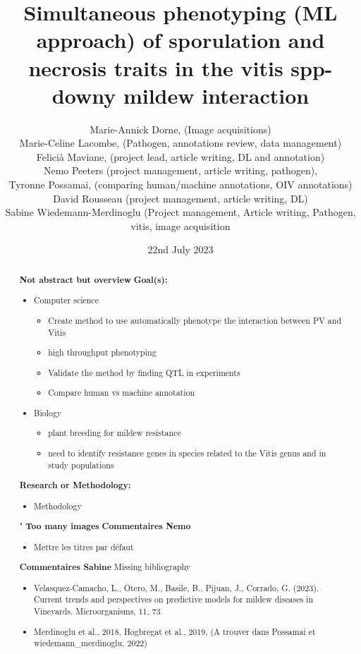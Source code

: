 \documentclass[english]{article}
\title{Simultaneous phenotyping (ML approach) of sporulation and necrosis traits in the vitis spp-downy mildew interaction}
\date{22nd July 2023}
\author{
Marie-Annick Dorne, (Image acquisitions)\\
Marie-Celine Lacombe, (Pathogen, annotations review, data management)\\
Felicià Maviane, (project lead, article writing, DL and annotation)\\
Nemo Peeters (project management, article writing, pathogen),\\
Tyronne Possamai, (comparing human/machine annotations, OIV annotations)\\
David Rousseau (project management, article writing, DL)\\
Sabine Wiedemann-Merdinoglu (Project management, Article writing, Pathogen, vitis, image acquisition\\
}
\begin{document}
\maketitle

\begin{changemargin}{60pt}{60pt}
	\begin{abstract}
		\textbf{Not abstract but overview} \newline
		\textbf{Goal(s):}
		\begin{itemize}
			\item Computer science
			      \begin{itemize}
				      \item Create method to use automatically phenotype the interaction between PV and Vitis
				      \item high throughput phenotyping
				      \item Validate the method by finding QTL in  experiments
				      \item Compare human vs machine annotation
			      \end{itemize}
			\item Biology
			      \begin{itemize}
				      \item plant breeding for mildew resistance
				      \item need to identify resistance genes in species related to the Vitis genus and in study populations
			      \end{itemize}
		\end{itemize}
		\textbf{Research or Methodology:}
		\begin{itemize}
			\item Methodology
		\end{itemize}"
		\textbf{Too many images}
            \textbf{Commentaires Nemo}
            \begin{itemize}
                \item Mettre les titres par défaut
            \end{itemize}
            \textbf{Commentaires Sabine}
            Missing bibliography
            \begin{itemize}
            	\item Velasquez-Camacho, L., Otero, M., Basile, B., Pijuan, J., Corrado, G. (2023). Current trends and perspectives on predictive models for mildew diseases in Vineyards. Microorganisms, 11, 73
            	\item Merdinoglu et al., 2018, Hogbregat et al., 2019, (A trouver dans Possamai et wiedemann\_merdinoglu, 2022)

\end{itemize}
\end{abstract}
\end{changemargin}
\end{document}
